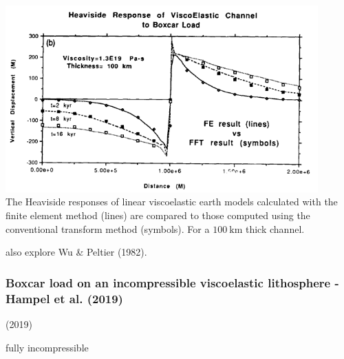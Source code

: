 \begin{center}
\includegraphics[width=12cm]{images/viscoelasticity/wu92}\\
{\captionfont The Heaviside responses of linear viscoelastic earth models calculated 
with the finite element method (lines) are compared to those computed using the conventional 
transform method (symbols). For a $100~\si{\km}$ thick channel.}
\end{center}

also explore Wu \& Peltier \cite{wupe82} (1982).


\subsubsection{Boxcar load on an incompressible viscoelastic lithosphere - Hampel et al. (2019)}


\textcite{halk19} (2019)

{\color{orange} fully incompressible}

